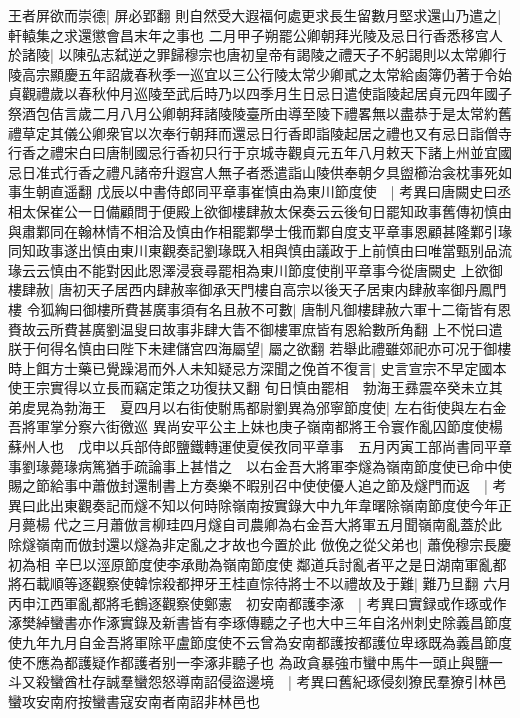 王者屏欲而崇德|{
	屏必郢翻}
則自然受大遐福何處更求長生留數月堅求還山乃遣之|{
	軒轅集之求還懲會昌末年之事也}
二月甲子朔罷公卿朝拜光陵及忌日行香悉移宫人於諸陵|{
	以陳弘志弑逆之罪歸穆宗也唐初皇帝有謁陵之禮天子不躬謁則以太常卿行陵高宗顯慶五年詔歲春秋季一巡宜以三公行陵太常少卿貳之太常給鹵簿仍著于令始貞觀禮歲以春秋仲月巡陵至武后時乃以四季月生日忌日遣使詣陵起居貞元四年國子祭酒包佶言歲二月八月公卿朝拜諸陵陵臺所由導至陵下禮畧無以盡恭于是太常約舊禮草定其儀公卿衆官以次奉行朝拜而還忌日行香即詣陵起居之禮也又有忌日詣僧寺行香之禮宋白曰唐制國忌行香初只行于京城寺觀貞元五年八月敕天下諸上州並宜國忌日准式行香之禮凡諸帝升遐宫人無子者悉遣詣山陵供奉朝夕具盥櫛治衾枕事死如事生朝直遥翻}
戊辰以中書侍郎同平章事崔慎由為東川節度使　|{
	考異曰唐闕史曰丞相太保崔公一日備顧問于便殿上欲御樓肆赦太保奏云云後旬日罷知政事舊傳初慎由與肅鄴同在翰林情不相洽及慎由作相罷鄴學士俄而鄴自度支平章事恩顧甚隆鄴引瑑同知政事遂出慎由東川東觀奏記劉瑑既入相與慎由議政于上前慎由曰唯當甄别品流瑑云云慎由不能對因此恩澤浸衰尋罷相為東川節度使削平章事今從唐闕史}
上欲御樓肆赦|{
	唐初天子居西内肆赦率御承天門樓自高宗以後天子居東内肆赦率御丹鳳門樓}
令狐綯曰御樓所費甚廣事須有名且赦不可數|{
	唐制凡御樓肆赦六軍十二衛皆有恩賚故云所費甚廣劉温叟曰故事非肆大眚不御樓軍庶皆有恩給數所角翻}
上不悦曰遣朕于何得名慎由曰陛下未建儲宫四海屬望|{
	屬之欲翻}
若舉此禮雖郊祀亦可况于御樓時上餌方士藥已覺躁渇而外人未知疑忌方深聞之俛首不復言|{
	史言宣宗不早定國本使王宗實得以立長而竊定策之功復扶又翻}
旬日慎由罷相　勃海王彞震卒癸未立其弟䖍晃為勃海王　夏四月以右街使駙馬都尉劉異為邠寧節度使|{
	左右街使與左右金吾將軍掌分察六街徼巡}
異尚安平公主上妹也庚子嶺南都將王令寰作亂囚節度使楊蘇州人也　戊申以兵部侍郎鹽鐵轉運使夏侯孜同平章事　五月丙寅工部尚書同平章事劉瑑薨瑑病篤猶手疏論事上甚惜之　以右金吾大將軍李燧為嶺南節度使已命中使賜之節給事中蕭倣封還制書上方奏樂不暇别召中使使優人追之節及燧門而返　|{
	考異曰此出東觀奏記而燧不知以何時除嶺南按實錄大中九年韋曙除嶺南節度使今年正月薨楊代之三月蕭倣言柳珪四月燧自司農卿為右金吾大將軍五月聞嶺南亂蓋於此除燧嶺南而倣封還以燧為非定亂之才故也今置於此}
倣俛之從父弟也|{
	蕭俛穆宗長慶初為相}
辛巳以涇原節度使李承勛為嶺南節度使鄰道兵討亂者平之是日湖南軍亂都將石載順等逐觀察使韓悰殺都押牙王桂直悰待將士不以禮故及于難|{
	難乃旦翻}
六月丙申江西軍亂都將毛鶴逐觀察使鄭憲　初安南都護李涿　|{
	考異曰實録或作琢或作涿樊綽蠻書亦作涿實錄及新書皆有李琢傳聽之子也大中三年自洺州刺史除義昌節度使九年九月自金吾將軍除平盧節度使不云曾為安南都護按都護位卑琢既為義昌節度使不應為都護疑作都護者别一李涿非聽子也}
為政貪暴強市蠻中馬牛一頭止與鹽一斗又殺蠻酋杜存誠羣蠻怨怒導南詔侵盜邊境　|{
	考異曰舊紀琢侵刻獠民羣獠引林邑蠻攻安南府按蠻書寇安南者南詔非林邑也}
